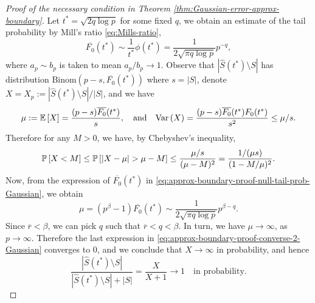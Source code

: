 \begin{proof}[Proof of the necessary condition in Theorem \ref{thm:Gaussian-error-approx-boundary}]
Let $t^* = \sqrt{2q\log{p}}$ for some fixed $q$, we obtain an estimate of the tail probability by Mill's ratio \eqref{eq:Mills-ratio}, 
\begin{equation}
    \overline{F_0}(t^*) 
    \sim \frac{1}{t^*}\phi(t^*)
    = \frac{1}{2\sqrt{\pi q\log{p}}} p^{-q}, \label{eq:approx-boundary-proof-null-tail-prob-Gaussian}
\end{equation}
where $a_p\sim b_p$ is taken to mean $a_p/b_p\to 1$.
Observe that $|\widehat{S}(t^*)\setminus{S}|$ has distribution $\text{Binom}(p-s, \overline{F_0}(t^*))$ where $s=|S|$, denote $X = X_p := {|\widehat{S}(t^*)\setminus{S}|}/{|S|}$, and we have 
$$
\mu := \E\left[X\right] = \frac{(p-s)\overline{F_0}(t^*)}{s},
\quad \text{and} \quad
\var\left(X\right) = \frac{(p-s)\overline{F_0}(t^*){F_0}(t^*)}{s^2} \le \mu/s.
$$
Therefore for any $M>0$, we have, by Chebyshev's inequality,
\begin{equation}
    \P\left[X < M\right] 
    \le \P\left[\left|X-\mu\right| > \mu - M\right]
    \le \frac{\mu/s}{(\mu-M)^2}
    = \frac{1/(\mu s)}{(1-M/\mu)^2}. \label{eq:approx-boundary-proof-converse-2-Gaussian}
\end{equation}
Now, from the expression of $\overline{F_0}(t^*)$ in \eqref{eq:approx-boundary-proof-null-tail-prob-Gaussian}, we obtain
$$
\mu = (p^\beta - 1)\overline{F_0}(t^*) \sim \frac{1}{2\sqrt{\pi q\log{p}}} p^{\beta-q}.
$$
Since $\overline{r}<\beta$, we can pick $q$ such that $\overline{r}<q<\beta$. 
In turn, we have $\mu \to\infty$, as $p\to\infty$.
Therefore the last expression in \eqref{eq:approx-boundary-proof-converse-2-Gaussian} converges to 0, and we conclude that $X\to\infty$ in probability, and hence
\begin{equation} \label{eq:approx-boundary-proof-converse-3-Gaussian}
\frac{|\widehat{S}(t^*)\setminus{S}|}{|\widehat{S}(t^*)\setminus{S}|+|{S}|} 
= \frac{X}{X+1} \to 1 \quad \text{in probability}.
\end{equation}


\end{proof}
